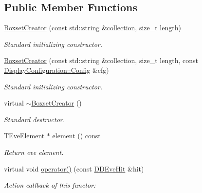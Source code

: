 \subsection*{Public Member Functions}
\begin{DoxyCompactItemize}
\item 
\hyperlink{struct_d_d4hep_1_1_boxset_creator_ae1b4d9e1ebffeed4bce0e2be8ab60396}{Boxset\+Creator} (const std\+::string \&collection, size\+\_\+t length)
\begin{DoxyCompactList}\small\item\em Standard initializing constructor. \end{DoxyCompactList}\item 
\hyperlink{struct_d_d4hep_1_1_boxset_creator_a8fd3750929d22eb789720db97194c48e}{Boxset\+Creator} (const std\+::string \&collection, size\+\_\+t length, const \hyperlink{class_d_d4hep_1_1_display_configuration_1_1_config}{Display\+Configuration\+::\+Config} \&cfg)
\begin{DoxyCompactList}\small\item\em Standard initializing constructor. \end{DoxyCompactList}\item 
virtual \hyperlink{struct_d_d4hep_1_1_boxset_creator_a244124a28255dd2e0533a64ce7ee1b56}{$\sim$\+Boxset\+Creator} ()
\begin{DoxyCompactList}\small\item\em Standard destructor. \end{DoxyCompactList}\item 
T\+Eve\+Element $\ast$ \hyperlink{struct_d_d4hep_1_1_boxset_creator_adb521f21af3ee2f647e9f3c3219611aa}{element} () const
\begin{DoxyCompactList}\small\item\em Return eve element. \end{DoxyCompactList}\item 
virtual void \hyperlink{struct_d_d4hep_1_1_boxset_creator_a25f63197d03ad33193ac3c77207db808}{operator()} (const \hyperlink{class_d_d4hep_1_1_d_d_eve_hit}{D\+D\+Eve\+Hit} \&hit)
\begin{DoxyCompactList}\small\item\em Action callback of this functor\+: \end{DoxyCompactList}\end{DoxyCompactItemize}
